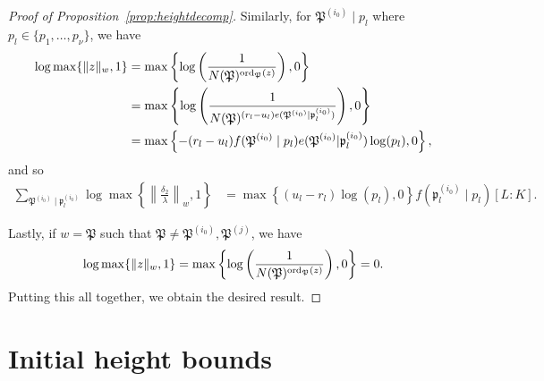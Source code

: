 \begin{proof}[Proof of Proposition~\ref{prop:heightdecomp}]
Similarly, for $\mathfrak{P}^{(i_0)}\mid p_l$ where $p_l \in \{p_1, \dots, p_{\nu}\}$, we have
\begin{align*}
 \log \max \{ \|z\|_{w}, 1\}	
 	& = \max \left\{ \log\left(\frac{1}{N(\mathfrak{P})^{\operatorname{ord}_{\mathfrak{P}}(z)}} \right), 0\right\}\\
	& = \max \left\{ \log\left(\frac{1}{N(\mathfrak{P})^{(r_l - u_l)e(\mathfrak{P}^{(i_0)}|\mathfrak{p}_l^{(i_0)})}} \right), 0\right\}\\
	& = \max \left\{ -(r_l - u_l)f(\mathfrak{P}^{(i_0)}\mid p_l)e(\mathfrak{P}^{(i_0)}|\mathfrak{p}_l^{(i_0)})\log(p_l), 0\right\},
\end{align*}
and so
\begin{align*}
\sum_{\mathfrak{P}^{(i_0)} \mid \mathfrak{p}_l^{(i_0)}} \log \max \left\{ \left\|\frac{\delta_2}{\lambda}\right\|_{w}, 1\right\}
	& = \max \left\{ (u_l - r_l)\log(p_l), 0\right\}f(\mathfrak{p}_l^{(i_0)}\mid p_l)[L:K].
\end{align*}

Lastly, if $w = \mathfrak{P}$ such that $\mathfrak{P} \neq \mathfrak{P}^{(i_0)},  \mathfrak{P}^{(j)}$, we have
\[\log \max \{ \|z\|_{w}, 1\} = \max \left\{ \log\left(\frac{1}{N(\mathfrak{P})^{\operatorname{ord}_{\mathfrak{P}}(z)}} \right), 0\right\}=0.\]
Putting this all together, we obtain the desired result. 
\end{proof}

\section{Initial height bounds}
\label{sec:InitialHeightBounds}

